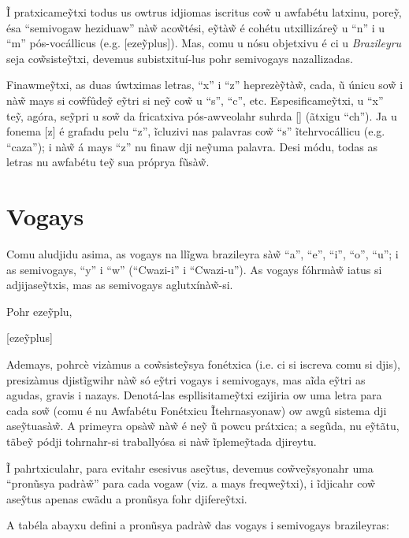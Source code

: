 \documentclass[12pt, a5paper, titlepage]{article}
\begin{document}
\begin{bilingualpages}

    Ĩ pratxicame\~ytxi todus us owtrus idjiomas iscritus co\~w u awfabétu latxinu, pore\~y, ésa ``semivogaw heziduaw'' nà\~w aco\~wtési, e\~ytà\~w é cohétu utxillizáre\~y u ``n'' i u ``m'' pós-vocállicus (e.g. [eze\~yplus]). Mas, comu u nósu objetxivu é ci u \textit{Brazileyru} seja co\~wsiste\~ytxi, devemus subistxituí-lus pohr semivogays nazallizadas.

    Finawme\~ytxi, as duas úwtximas letras, ``x'' i ``z'' heprezè\~ytà\~w, cada, ũ
    únicu so\~w i nà\~w mays si co\~wfûde\~y e\~ytri si ne\~y co\~w u ``s'', ``c'',
    etc. Espesificame\~ytxi, u ``x'' te\~y, agóra, se\~ypri u so\~w da fricatxiva
    pós-awveolahr suhrda [\textesh] (ãtxigu ``ch''). Ja u fonema [z] é grafadu pelu
    ``z'', ĩcluzivi nas palavras co\~w ``s'' ĩtehrvocállicu (e.g. ``caza''); i
    nà\~w á mays ``z'' nu finaw dji ne\~yuma palavra. Desi módu, todas as letras nu
    awfabétu te\~y sua próprya fũsà\~w.

    \section{Vogays}
    Comu aludjidu asima, as vogays na llĩgwa brazileyra sà\~w ``a'', ``e'', ``i'',
    ``o'', ``u''; i as semivogays, ``y'' i ``w'' (``Cwazi-i'' i ``Cwazi-u''). As
    vogays fóhrmà\~w iatus si adjijase\~ytxis, mas as semivogays aglutxínà\~w-si.

    Pohr eze\~yplu,

    [eze\~yplus]

    Ademays, pohrcè vizàmus a co\~wsiste\~ysya fonétxica (i.e. ci si iscreva comu
    si djis), presizàmus djistĩgwihr nà\~w só e\~ytri vogays i semivogays, mas aĩda
    e\~ytri as agudas, gravis i nazays. Denotá-las espllisitame\~ytxi ezijiria ow
    uma letra para cada so\~w (comu é nu Awfabétu Fonétxicu Ĩtehrnasyonaw) ow awgû
    sistema dji ase\~ytuasà\~w. A primeyra opsà\~w nà\~w é ne\~y ũ powcu prátxica;
    a segũda, nu e\~ytãtu, tãbe\~y pódji tohrnahr-si traballyósa si nà\~w
    ĩpleme\~ytada djireytu.

    Ĩ pahrtxiculahr, para evitahr esesivus ase\~ytus, devemus co\~wve\~ysyonahr uma ``pronũsya padrà\~w'' para cada vogaw (viz. a mays freqwe\~ytxi), i ĩdjicahr co\~w ase\~ytus apenas cwãdu a pronũsya fohr djifere\~ytxi.

    A tabéla abayxu defini a pronũsya padrà\~w das vogays i semivogays brazileyras:

    \BrTableVowels


\end{bilingualpages}
\end{document}

